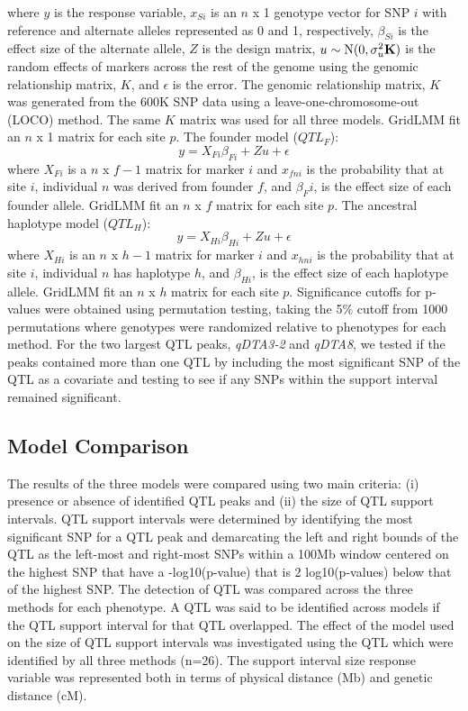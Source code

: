 \documentclass[9pt,twocolumn,twoside]{gsag3jnl}
\begin{document}
where $y$ is the response variable, $x_{Si}$ is an $n$ x 1 genotype vector for SNP $i$ with reference and alternate alleles represented as 0 and 1, respectively, $\beta_{Si}$ is the effect size of the alternate allele, $Z$ is the design matrix, $u \sim \mbox{N}(0,\sigma^2_u \bf{K})$ is the random effects of markers across the rest of the genome using the genomic relationship matrix, $K$, and $\epsilon$ is the error.
The genomic relationship matrix, $K$ was generated from the 600K SNP data using a leave-one-chromosome-out (LOCO) method.
The same $K$ matrix was used for all three models.
GridLMM fit an $n$ x 1 matrix for each site $p$.
The founder model ($QTL_F$):
\begin{equation}
\label{eqn:gridlmm2}
 y = X_{Fi}{\beta_{Fi}} + Zu + \epsilon
\end{equation}
where $X_{Fi}$ is a $n$ x $f-1$ matrix for marker $i$ and $x_{fni}$ is the probability that at site $i$, individual $n$ was derived from founder $f$, and $\beta_Fi$, is the effect size of each founder allele. GridLMM fit an $n$ x $f$ matrix for each site $p$.
The ancestral haplotype model ($QTL_H$):
\begin{equation}
\label{eqn:gridlmm3}
 y = X_{Hi}{\beta_{Hi}} + Zu + \epsilon
\end{equation}
where $X_{Hi}$ is an $n$ x $h-1$ matrix for marker $i$ and $x_{hni}$ is the probability that at site $i$, individual $n$ has haplotype $h$, and $\beta_{Hi}$, is the effect size of each haplotype allele. GridLMM fit an $n$ x $h$ matrix for each site $p$.
Significance cutoffs for p-values were obtained using permutation testing, taking the 5\% cutoff from 1000 permutations where genotypes were randomized relative to phenotypes for each method.
For the two largest QTL peaks, \emph{qDTA3-2} and \emph{qDTA8}, we tested if the peaks contained more than one QTL by including the most significant SNP of the QTL as a covariate and testing to see if any SNPs within the support interval remained significant.

 \subsection{Model Comparison}
The results of the three models were compared using two main criteria: (i) presence or absence of identified QTL peaks and (ii) the size of QTL support intervals.
QTL support intervals were determined by identifying the most significant SNP for a QTL peak and demarcating the left and right bounds of the QTL as the left-most and right-most SNPs within a 100Mb window centered on the highest SNP that have a -log10(p-value) that is 2 log10(p-values) below that of the highest SNP.
The detection of QTL was compared across the three methods for each phenotype.
A QTL was said to be identified across models if the QTL support interval for that QTL overlapped.
The effect of the model used on the size of QTL support intervals was investigated using the QTL which were identified by all three methods (n=26).
The support interval size response variable was represented both in terms of physical distance (Mb) and genetic distance (cM).
\end{document}
